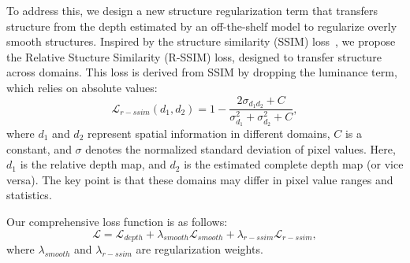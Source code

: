 To address this, we design a new structure regularization term that transfers structure from the depth estimated by an off-the-shelf model to regularize overly smooth structures.
Inspired by the structure similarity (SSIM) loss~\cite{wang2004ssim}, we propose the Relative Stucture Similarity (R-SSIM) loss, designed to transfer structure across domains.
This loss is derived from SSIM by dropping the luminance term, which relies on absolute values:
\begin{equation}
    \mathcal{L}_{r-ssim}(d_1,d_2) = 1-\frac{2\sigma_{d_1d_2} + C}{\sigma_{d_1}^2 + \sigma_{d_2}^2 + C},
\end{equation}
where $d_1$ and $d_2$ represent spatial information in different domains, $C$ is a constant, and $\sigma$ denotes the normalized standard deviation of pixel values.
Here, $d_1$ is the relative depth map, and $d_2$ is the estimated complete depth map (or vice versa).
The key point is that these domains may differ in pixel value ranges and statistics. 

\vspace{1.5mm}
\noindent Our comprehensive loss function is as follows:
\begin{equation}
    \mathcal{L} = \mathcal{L}_{depth} + \lambda_{smooth} \mathcal{L}_{smooth} + \lambda_{r-ssim} \mathcal{L}_{r-ssim},
\end{equation}
where $\lambda_{smooth}$ and $\lambda_{r-ssim}$ are regularization weights.
